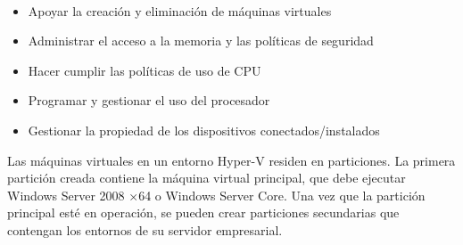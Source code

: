 \documentclass[journal]{IEEEtran}
\begin{document}
\\
\begin{itemize}
\item Apoyar la creación y eliminación de máquinas virtuales
\item Administrar el acceso a la memoria y las políticas de seguridad
\item Hacer cumplir las políticas de uso de CPU
\item Programar y gestionar el uso del procesador
\item Gestionar la propiedad de los dispositivos conectados/instalados
\end{itemize}
Las máquinas virtuales en un entorno Hyper-V residen en particiones. La primera partición creada contiene la máquina virtual principal, que debe ejecutar Windows Server 2008 ×64 o Windows Server Core. Una vez que la partición principal esté en operación, se pueden crear particiones secundarias que contengan los entornos de su servidor empresarial.\cite{OLZAK20101}
\end{document}
